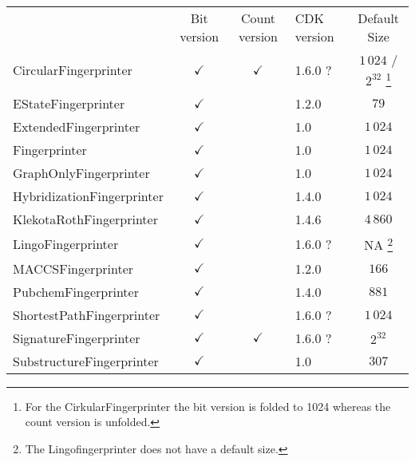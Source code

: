 \documentclass[10pt]{bmcart}
\begin{document}
\begin{backmatter}
    \begin{minipage}{1\textwidth}
    \renewcommand*{\thempfootnote}{\fnsymbol{mpfootnote}}
    \centering
    \begin{tabular}{lcclc}
                             & Bit version  & Count version & CDK version & Default Size    \\
  CircularFingerprinter~\cite{rogers2010extended, Clark2014}      & $\checkmark$ & $\checkmark$  & 1.6.0 ?     & $1\,024$ / $2^{32}$%
\footnote[1]{For the CirkularFingerprinter the bit version is folded to 1024 whereas the count version is unfolded.} \\
  EStateFingerprinter~\cite{Hall1995}       & $\checkmark$ &               & 1.2.0       & $79$            \\
  ExtendedFingerprinter      & $\checkmark$ &               & 1.0         & $1\,024$        \\
  Fingerprinter              & $\checkmark$ &               & 1.0         & $1\,024$        \\
  GraphOnlyFingerprinter     & $\checkmark$ &               & 1.0         & $1\,024$        \\
  HybridizationFingerprinter & $\checkmark$ &               & 1.4.0       & $1\,024$        \\
  KlekotaRothFingerprinter~\cite{Klekota2008}   & $\checkmark$ &               & 1.4.6       & $4\,860$        \\
  LingoFingerprinter~\cite{vidal2005lingo}         & $\checkmark$ &               & 1.6.0 ?     & NA%
\footnote[2]{The Lingofingerprinter does not have a default size.}
                                                                                             \\
  MACCSFingerprinter         & $\checkmark$ &               & 1.2.0       & $166$           \\
  PubchemFingerprinter~\cite{pubchemFP}       & $\checkmark$ &               & 1.4.0       & $881$            \\
  ShortestPathFingerprinter  & $\checkmark$ &               & 1.6.0 ?     & $1\,024$        \\
  SignatureFingerprinter~\cite{signaturefingerprints}     & $\checkmark$ & $\checkmark$  & 1.6.0 ?     & $2^{32}$         \\
  SubstructureFingerprinter  & $\checkmark$ &               & 1.0         & $307$           \\

    \end{tabular}
    \end{minipage}


\end{backmatter}
\end{document}
